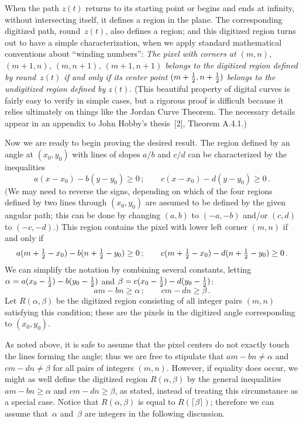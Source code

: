 When the path $z(t)$ returns to its starting point or begins and ends
at infinity, without intersecting itself, it defines a region in
the plane. The corresponding digitized path,  round~$z(t)$, also
defines a region; and this digitized region turns out to have a simple
characterization, when we apply standard mathematical 
conventions about ``winding
numbers'': {\sl The pixel with corners at\/ $(m,n)$, $(m+1,n)$,
$(m,n+1)$, $(m+1,n+1)$ belongs to the digitized region defined by\/
{\rm round}~$z(t)$ if and only if its center point\/ 
$(m+{1\over 2},
\allowbreak
n+{1\over 2})$ belongs to the undigitized region defined by\/
$z(t)$}.  (This beautiful property of digital curves is fairly easy to
verify in simple cases, but a rigorous proof is  difficult
because it relies ultimately on things like the Jordan Curve Theorem.
The necessary details appear in an appendix to John Hobby's
thesis~[2], Theorem A.4.1.)

Now we are ready to begin proving the desired result. The region
defined by an angle at $(x_0,y_0)$ with lines of slopes $a/b$ and
$c/d$ can be characterized by the inequalities
$$a(x-x_0)-b(y-y_0)\geq 0\,;\qquad c(x-x_0)-d(y-y_0)\geq 0\,.$$
$\bigl($We may need to reverse the signs, depending on which of the four
regions defined by two lines through $(x_0,y_0)$ are assumed to be defined
by the given angular path; this can be done by changing $(a,b)$ to
$(-a,-b)$ and/or $(c,d)$ to $(-c,-d)$.$\bigr)$
This region contains the pixel with lower left corner $(m,n)$ if and
only if 
$$\textstyle a(m+{1\over 2}-x_0)-b(n+{1\over 2}-y_0)\geq 0\,;\qquad
c(m+{1\over 2}-x_0)-d(n+{1\over 2}-y_0)\geq 0\,.$$
We can simplify the notation by combining several constants,
letting
$\alpha =a(x_0-{1\over
2})-b(y_0-{1\over 2})$ and $\beta=c(x_0-{1\over 2})-d(y_0-{1\over 2})$:
$$am-bn\geq\alpha\,;\qquad cm-dn\geq\beta\,.$$
Let $R(\alpha,\beta)$ be the digitized region consisting of all
integer pairs $(m,n)$ satisfying this condition; these are the pixels
in the digitized angle corresponding to $(x_0,y_0)$.

As noted above, it is safe to assume that the pixel centers do not
exactly touch the lines forming the angle; thus we are free to
stipulate that $am-bn\not=\alpha$ and $cm-dn\not=\beta$ for all pairs
of integers $(m,n)$. However, if equality does occur, we might as well
define the digitized region $R(\alpha,\beta)$ by the general
inequalities $am-bn\geq \alpha$ and $cm-dn\geq \beta$, 
as stated, instead of treating this circumstance as a special case.
Notice that $R(\alpha,\beta)$ is equal to $R(\lceil\beta\rceil)$;
therefore we can assume that~$\alpha$ and~$\beta$ are integers in the
following discussion. 

